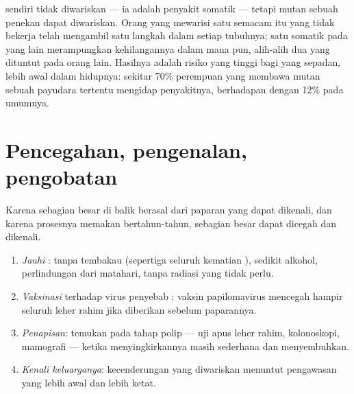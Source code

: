 \begin{proposition}\label{prop:g11:cancer:inherited}
 sendiri tidak diwariskan --- ia adalah penyakit 
somatik --- tetapi  mutan sebuah  penekan dapat diwariskan.
Orang yang mewarisi satu   semacam itu yang tidak bekerja telah
mengambil satu langkah dalam setiap  tubuhnya; satu  somatik
pada  yang lain merampungkan kehilangannya dalam  mana pun,
alih-alih dua  yang dituntut pada orang lain. Hasilnya adalah
risiko yang tinggi bagi  yang sepadan, lebih awal dalam hidupnya:
sekitar 70\% perempuan yang membawa  mutan sebuah  
payudara tertentu mengidap penyakitnya, berhadapan dengan 12\% pada
umumnya.
\end{proposition}
\admitted

\section{Pencegahan, pengenalan, pengobatan}

\begin{method}\label{met:g11:cancer:prevention}
Karena sebagian besar  di balik  berasal dari paparan yang
dapat dikenali, dan karena prosesnya memakan bertahun-tahun, 
sebagian besar dapat dicegah dan dikenali.
\begin{enumerate}
  \item \emph{Jauhi }: tanpa tembakau (sepertiga seluruh
        kematian ), sedikit alkohol, perlindungan dari matahari,
        tanpa radiasi yang tidak perlu.
  \item \emph{Vaksinasi} terhadap virus penyebab : vaksin
        papilomavirus mencegah hampir seluruh  leher rahim jika
        diberikan sebelum paparannya.
  \item \emph{Penapisan}: temukan  pada tahap polip --- uji
        apus leher rahim, kolonoskopi, mamografi --- ketika
        menyingkirkannya masih sederhana dan menyembuhkan.
  \item \emph{Kenali keluarganya}: kecenderungan yang diwariskan
        menuntut pengawasan yang lebih awal dan lebih ketat.
\end{enumerate}
\end{method}

